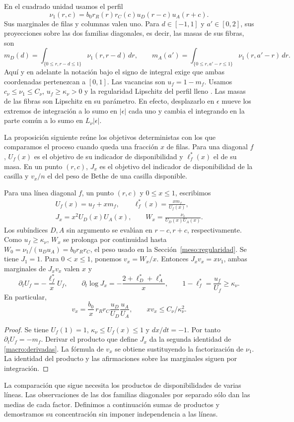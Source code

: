 En el cuadrado unidad usamos el perfil
\[
 \nu_1(r,c)=b_0r_R(r)r_C(c)u_D(r-c)u_A(r+c).
\]
Sus marginales de filas y columnas valen uno. Para $d\in[-1,1]$ y $a'\in[0,2]$, sus proyecciones
sobre las dos familias diagonales, es decir, las masas de sus fibras, son
\[
 m_D(d)=\int_{\{0\le r,r-d\le1\}}\nu_1(r,r-d)\,dr,\qquad
 m_A(a')=\int_{\{0\le r,a'-r\le1\}}\nu_1(r,a'-r)\,dr .
\]
Aquí y en adelante la notación bajo el signo de integral exige que ambas coordenadas pertenezcan a
$[0,1]$. Las vacancias son $u_f=1-m_f$. Usamos $c_\nu\le\nu_1\le C_\nu$, $u_f\ge\kappa_\nu>0$ y la
regularidad Lipschitz del perfil lleno \cite[Teoremas~1.1--1.3, Proposición~5.2 y
Teorema~7.7]{perfil}. Las masas de las fibras son Lipschitz en su parámetro. En efecto, desplazarlo en
$\epsilon$ mueve los extremos de integración a lo sumo en $|\epsilon|$ cada uno y cambia el integrando
en la parte común a lo sumo en $L_\nu|\epsilon|$.

La proposición siguiente reúne los objetivos deterministas con los que comparamos el proceso cuando
queda una fracción $x$ de filas. Para una diagonal $f$, $U_f(x)$ es el objetivo de su indicador de
disponibilidad y $\ell_f^*(x)$ el de su masa. En un punto $(r,c)$, $J_x$ es el objetivo del indicador
de disponibilidad de la casilla y $v_x/n$ el del peso de Bethe de una casilla disponible.

\begin{proposicion}\label{macro:trayectoria}
Para una línea diagonal $f$, un punto $(r,c)$ y $0\le x\le1$, escribimos
\begin{gather*}
 U_f(x)=u_f+xm_f,\qquad \ell_f^*(x)=\frac{xm_f}{U_f(x)},\\
 J_x=x^2U_D(x)U_A(x),\qquad
 W_x=\frac{\nu_1}{U_D(x)U_A(x)}.
\end{gather*}
Los subíndices $D,A$ sin argumento se evalúan en $r-c,r+c$, respectivamente. Como $u_f\ge\kappa_\nu$,
$W_x$ se prolonga por continuidad hasta $W_0=\nu_1/(u_Du_A)=b_0r_Rr_C$, el peso usado en la
Sección~\ref{meso:regularidad}. Se tiene $J_1=1$. Para $0<x\le1$, ponemos $v_x=W_x/x$. Entonces
$J_xv_x=x\nu_1$, ambas marginales de $J_xv_x$ valen $x$ y
\begin{equation}\label{macro:derivadas}
 \partial_t U_f=-\frac{\ell_f^*}{x}U_f,\qquad
 \partial_t\log J_x=-\frac{2+\ell_D^*+\ell_A^*}{x},\qquad
 1-\ell_f^*=\frac{u_f}{U_f}\ge\kappa_\nu .
\end{equation}
En particular,
\[
 v_x=\frac{b_0}{x}\,r_Rr_C\frac{u_D}{U_D}\frac{u_A}{U_A},
 \qquad xv_x\le C_\nu/\kappa_\nu^2 .
\]
\end{proposicion}
\begin{proof}
Se tiene $U_f(1)=1$, $\kappa_\nu\le U_f(x)\le1$ y $dx/dt=-1$. Por tanto $\partial_t U_f=-m_f$. Derivar
el producto que define $J_x$ da la segunda identidad de \eqref{macro:derivadas}. La fórmula de $v_x$
se obtiene sustituyendo la factorización de $\nu_1$. La identidad del producto y las afirmaciones
sobre las marginales siguen por integración.
\end{proof}

La comparación que sigue necesita los productos de disponibilidades de varias líneas. Las
observaciones de las dos familias diagonales por separado sólo dan las medias de cada factor.
Definimos a continuación sumas de productos y demostramos su concentración sin imponer independencia a
las líneas.

